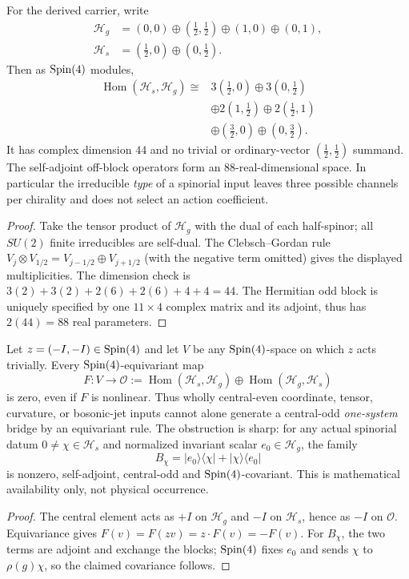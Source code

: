 \documentclass[12pt,a4paper]{article}
\begin{document}
\begin{theorem}
\label{p2b:thm:v264-odd-bridge-types}
For the derived carrier, write
\[
\begin{split}
\mathcal H_g&=(0,0)\oplus(\tfrac12,\tfrac12)
  \oplus(1,0)\oplus(0,1),\\
\mathcal H_s&=(\tfrac12,0)\oplus(0,\tfrac12).
\end{split}
\]
Then as $\mathrm{Spin}(4)$ modules,
\[
\boxed{\begin{aligned}
\operatorname{Hom}(\mathcal H_s,\mathcal H_g)
 \cong{}&3(\tfrac12,0)\oplus3(0,\tfrac12)\\
 &\oplus2(1,\tfrac12)\oplus2(\tfrac12,1)\\
 &\oplus(\tfrac32,0)\oplus(0,\tfrac32).
\end{aligned}}
\]
It has complex dimension $44$ and no trivial or ordinary-vector
$(\tfrac12,\tfrac12)$ summand. The self-adjoint off-block operators
form an $88$-real-dimensional space. In particular the irreducible
\emph{type} of a spinorial input leaves three possible channels per
chirality and does not select an action coefficient.
\end{theorem}
\begin{proof}
Take the tensor product of $\mathcal H_g$ with the dual of each
half-spinor; all $SU(2)$ finite irreducibles are self-dual. The
Clebsch--Gordan rule
$V_j\otimes V_{1/2}=V_{j-1/2}\oplus V_{j+1/2}$
(with the negative term omitted) gives the displayed multiplicities.
The dimension check is $3(2)+3(2)+2(6)+2(6)+4+4=44$.
The Hermitian odd block is uniquely specified by one $11\times4$
complex matrix and its adjoint, thus has $2(44)=88$ real parameters.
\end{proof}

\begin{theorem}
\label{p2b:thm:v264-central-even-no-go}
Let $z=(-I,-I)\in\mathrm{Spin}(4)$ and let $V$ be any $\mathrm{Spin}(4)$-space on
which $z$ acts trivially. Every $\mathrm{Spin}(4)$-equivariant map
\[
 F:V\longrightarrow
 \mathcal O:=\operatorname{Hom}(\mathcal H_s,\mathcal H_g)
 \oplus\operatorname{Hom}(\mathcal H_g,\mathcal H_s)
\]
is zero, even if $F$ is nonlinear. Thus wholly central-even
coordinate, tensor, curvature, or bosonic-jet inputs cannot alone
generate a central-odd \emph{one-system} bridge by an equivariant rule.
The obstruction is sharp: for any actual spinorial datum
$0\ne\chi\in\mathcal H_s$ and normalized invariant scalar
$e_0\in\mathcal H_g$, the family
\[
 B_\chi=|e_0\rangle\langle\chi|+|\chi\rangle\langle e_0|
\]
is nonzero, self-adjoint, central-odd and $\mathrm{Spin}(4)$-covariant.
This is mathematical availability only, not physical occurrence.
\end{theorem}
\begin{proof}
The central element acts as $+I$ on $\mathcal H_g$ and $-I$ on
$\mathcal H_s$, hence as $-I$ on $\mathcal O$. Equivariance gives
$F(v)=F(zv)=z\cdot F(v)=-F(v)$. For $B_\chi$, the two terms are
adjoint and exchange the blocks; $\mathrm{Spin}(4)$ fixes $e_0$ and sends
$\chi$ to $\rho(g)\chi$, so the claimed covariance follows.
\end{proof}
\end{document}
